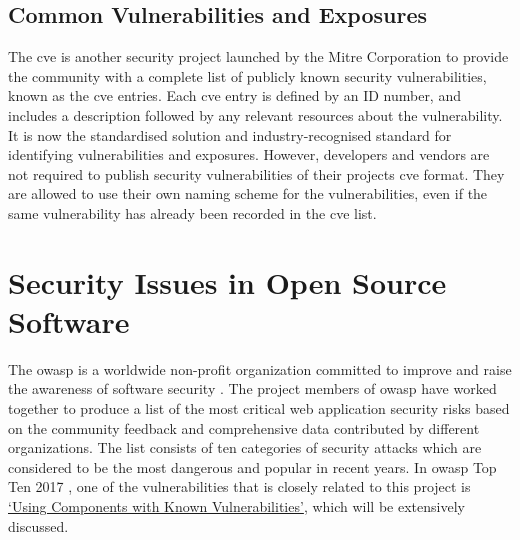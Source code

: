 \documentclass[12pt, a4paper]{report}
\begin{document}
\subsection{Common Vulnerabilities and Exposures}
The \acrfull{cve} is another security project launched by the Mitre Corporation \cite{cve} to
provide the community with a complete list of publicly known security vulnerabilities, known as the
\acrshort{cve} entries. Each \acrshort{cve} entry is defined by an ID number, and includes a
description followed by any relevant resources about the vulnerability. It is now the standardised
solution and industry-recognised standard for identifying vulnerabilities and exposures. However,
developers and vendors are not required to publish security vulnerabilities of their projects
\acrshort{cve} format. They are allowed to use their own naming scheme for the vulnerabilities, even
if the same vulnerability has already been recorded in the \acrshort{cve} list.

\section{Security Issues in Open Source Software}
The \acrfull{owasp} is a worldwide non-profit organization committed to improve and raise the
awareness of software security \cite{owasp_home}. The project members of \acrshort{owasp} have
worked together to produce a list of the most critical web application security risks based on the
community feedback and comprehensive data contributed by different organizations. The list consists
of ten categories of security attacks which are considered to be the most dangerous and popular in
recent years. In \acrshort{owasp} Top Ten 2017 \cite{owasp_top10}, one of the vulnerabilities that
is closely related to this project is \hyperref[subsec:components]{`Using Components with Known
Vulnerabilities'}, which will be extensively discussed.
\end{document}
